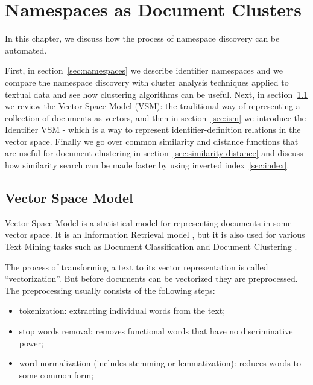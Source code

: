 \section{Namespaces as Document Clusters} \label{sec:namespaces-top}


In this chapter, we discuss how the process of namespace discovery
can be automated.

First, in section~\ref{sec:namespaces} we describe identifier namespaces and
we compare the namespace discovery with cluster analysis techniques
applied to textual data and see how clustering algorithms can be
useful. Next, in section~\ref{sec:vsm}
we review the Vector Space Model (VSM): the traditional way of
representing a collection of documents as vectors, and then in
section~\ref{sec:ism} we introduce the Identifier VSM - which
is a way to represent identifier-definition relations in the
vector space. Finally we go over common similarity and distance
functions that are useful for document clustering in
section~\ref{sec:similarity-distance} and discuss how similarity
search can be made faster by using inverted index~\ref{sec:index}.





\subsection{Vector Space Model} \label{sec:vsm}

Vector Space Model is a statistical model for representing documents
in some vector space. It is an Information Retrieval
model \cite{manning2008introduction}, but it is also used for various
Text Mining tasks such as Document Classification \cite{sebastiani2002machine}
and Document Clustering \cite{oikonomakou2005review} \cite{aggarwal2012survey}.

The process of transforming a text to its vector representation is
called ``vectorization''. But before documents can be
vectorized they are preprocessed. The preprocessing usually consists of the
following steps:

\begin{itemize}
\itemsep1pt\parskip0pt
  \item tokenization: extracting individual words from the text;
  \item stop words removal: removes functional words that have no discriminative power;
  \item word normalization (includes stemming or lemmatization): reduces words to some common form;
\end{itemize}

